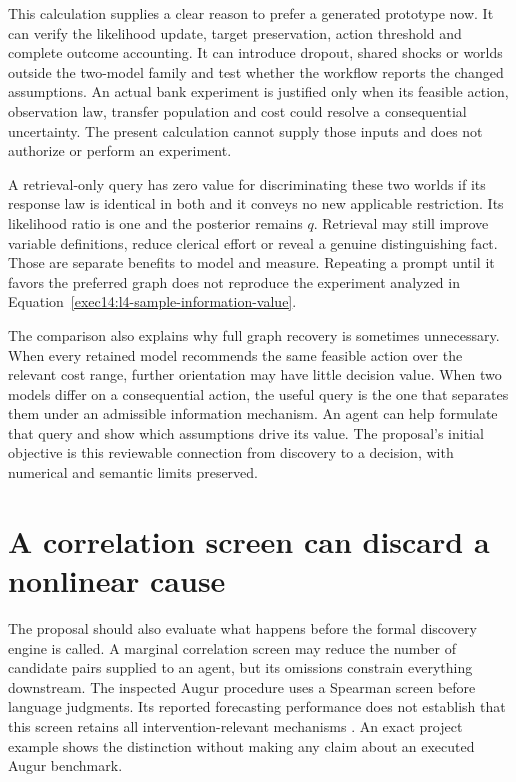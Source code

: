 This calculation supplies a clear reason to prefer a generated prototype now.
It can verify the likelihood update, target preservation, action threshold
and complete outcome accounting. It can introduce dropout, shared shocks or
worlds outside the two-model family and test whether the workflow reports
the changed assumptions. An actual bank experiment is justified only when
its feasible action, observation law, transfer population and cost could
resolve a consequential uncertainty. The present calculation cannot supply
those inputs and does not authorize or perform an experiment.

A retrieval-only query has zero value for discriminating these two worlds
if its response law is identical in both and it conveys no new applicable
restriction. Its likelihood ratio is one and the posterior remains $q$.
Retrieval may still improve variable definitions, reduce clerical effort or
reveal a genuine distinguishing fact. Those are separate benefits to model
and measure. Repeating a prompt until it favors the preferred graph does
not reproduce the experiment analyzed in Equation~\eqref{exec14:l4-sample-information-value}.

The comparison also explains why full graph recovery is sometimes unnecessary.
When every retained model recommends the same feasible action over the
relevant cost range, further orientation may have little decision value.
When two models differ on a consequential action, the useful query is the
one that separates them under an admissible information mechanism. An agent
can help formulate that query and show which assumptions drive its value.
The proposal's initial objective is this reviewable connection from discovery
to a decision, with numerical and semantic limits preserved.
\label{exec14:l4-completion-end}


\section{A correlation screen can discard a nonlinear cause}
\label{exec14:l4-nonlinear-screen}

The proposal should also evaluate what happens before the formal discovery
engine is called. A marginal correlation screen may reduce the number of
candidate pairs supplied to an agent, but its omissions constrain everything
downstream. The inspected Augur procedure uses a Spearman screen before
language judgments. Its reported forecasting performance does not establish
that this screen retains all intervention-relevant mechanisms
\citep{exec13_census_augur_arxiv}. An exact project example shows the
distinction without making any claim about an executed Augur benchmark.

